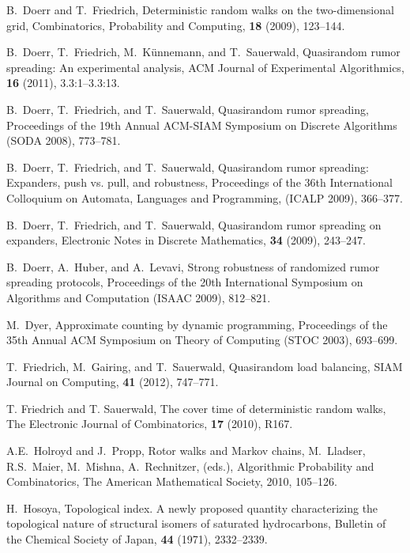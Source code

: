 \documentclass[letter, 11pt]{article}
\newcommand{\1}{\mbox{1}\hspace{-0.25em}\mbox{l}}
\begin{document}
\begin{thebibliography}{99}
 B.~Doerr and T.~Friedrich, 
 Deterministic random walks on the two-dimensional grid, 
 Combinatorics, Probability and Computing, {\bf 18} (2009), 123--144.

 B.~Doerr, T.~Friedrich, M.~K\"{u}nnemann, and T.~Sauerwald, 
 Quasirandom rumor spreading: An experimental analysis, 
 ACM Journal of Experimental Algorithmics, {\bf 16} (2011), 3.3:1--3.3:13.

 B.~Doerr, T.~Friedrich, and T.~Sauerwald, 
 Quasirandom rumor spreading, 
 Proceedings of the 19th Annual ACM-SIAM Symposium on Discrete Algorithms (SODA 2008), 
 773--781.

 B.~Doerr, T.~Friedrich, and T.~Sauerwald, 
 Quasirandom rumor spreading: Expanders, push vs. pull, and robustness, 
 Proceedings of the 36th International Colloquium on Automata, Languages and Programming, 
 (ICALP 2009), 366--377.

 B.~Doerr, T.~Friedrich, and T.~Sauerwald, 
 Quasirandom rumor spreading on expanders, 
 Electronic Notes in Discrete Mathematics, {\bf 34} (2009), 243--247.

 B.~Doerr, A.~Huber, and A.~Levavi, 
 Strong robustness of randomized rumor spreading protocols, 
 Proceedings of the 20th International Symposium on Algorithms and Computation 
 (ISAAC 2009), 812--821.

 M.~Dyer, 
 Approximate counting by dynamic programming, 
 Proceedings of the 35th Annual ACM Symposium on Theory of Computing (STOC 2003), 693--699. 


 T.~Friedrich, M.~Gairing, and T.~Sauerwald, 
 Quasirandom load balancing, 
 SIAM Journal on Computing, {\bf 41} (2012), 747--771.

 T. Friedrich and T. Sauerwald, 
 The cover time of deterministic random walks, 
 The Electronic Journal of Combinatorics, {\bf 17} (2010), R167. 



 A.E.~Holroyd and J.~Propp, 
 Rotor walks and Markov chains, 
 M.~Lladser, R.S.~Maier, M.~Mishna, A.~Rechnitzer, (eds.), 
 Algorithmic Probability and Combinatorics, 
 The American Mathematical Society, 2010, 105--126. 

 H.~Hosoya, 
 Topological index. 
 A newly proposed quantity characterizing the topological nature of structural isomers of saturated hydrocarbons, 
 Bulletin of the Chemical Society of Japan, {\bf 44} (1971), 2332--2339. 


\end{thebibliography}
\end{document}
